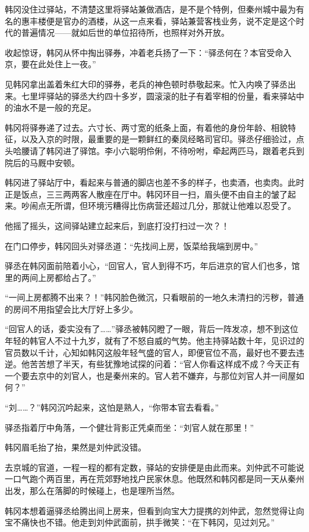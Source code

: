 韩冈没住过驿站，不清楚这里将驿站兼做酒店，是不是个特例，但秦州城中最为有名的惠丰楼便是官办的酒楼，从这一点来看，驿站兼营客栈业务，说不定是这个时代的普遍情况——就如后世的单位招待所，也照样对外开放。

收起惊讶，韩冈从怀中掏出驿券，冲着老兵扬了一下：“驿丞何在？本官受命入京，要在此处住上一夜。”

见韩冈拿出盖着朱红大印的驿券，老兵的神色顿时恭敬起来。忙入内唤了驿丞出来。七里坪驿站的驿丞大约四十多岁，圆滚滚的肚子有着宰相的份量，看来驿站中的油水不是一般的充足。

韩冈将驿券递了过去。六寸长、两寸宽的纸条上面，有着他的身份年龄、相貌特征，以及入京的时限，最重要的是一颗鲜红的秦凤经略司官印。驿丞仔细验过，点头哈腰请了韩冈进了驿馆。李小六聪明伶俐，不待吩咐，牵起两匹马，跟着老兵到院后的马厩中安顿。

韩冈进了驿站厅中，看起来与普通的脚店也差不多的样子，也卖酒，也卖肉。此时正是饭点，三三两两客人散座在厅中。韩冈环目一扫，眉头便不由自主的皱了起来。吵闹点无所谓，但环境污糟得比伤病营还超过几分，那就让他难以忍受了。

他摇了摇头，这间驿站建立起来后，到底打没打扫过一次？！

在门口停步，韩冈回头对驿丞道：“先找间上房，饭菜给我端到房中。”

驿丞在韩冈面前陪着小心，“回官人，官人到得不巧，年后进京的官人们也多，馆里的两间上房都给占了。”

“一间上房都腾不出来？！”韩冈脸色微沉，只看眼前的一地久未清扫的污秽，普通的房间不用指望会比大厅好上多少。

“回官人的话，委实没有了……”驿丞被韩冈瞪了一眼，背后一阵发凉，想不到这位年轻的韩官人不过十九岁，就有了不怒自威的气势。他主持驿站数十年，见识过的官员数以千计，心知如韩冈这般年轻气盛的官人，即便官位不高，最好也不要去违逆。他苦苦想了半天，有些犹豫地试探的问着：“官人你看这样成不成？今天正有一个要去京中的刘官人，也是秦州来的。官人若不嫌弃，与那位刘官人并一间屋如何？”

“刘……？”韩冈沉吟起来，这怕是熟人，“你带本官去看看。”

驿丞指着厅中角落，一个健壮背影正凭桌而坐：“刘官人就在那里！”

韩冈眉毛抬了抬，果然是刘仲武没错。

去京城的官道，一程一程的都有定数，驿站的安排便是由此而来。刘仲武不可能说一口气跑个两百里，再在荒郊野地找户民家休息。他既然和韩冈都是同一天从秦州出发，那么在落脚的时候碰上，也是理所当然。

韩冈本想着逼驿丞给腾出间上房来，但看到向宝大力提携的刘仲武，忽然觉得让向宝不痛快也不错。他走到刘仲武面前，拱手微笑：“在下韩冈，见过刘兄。”


